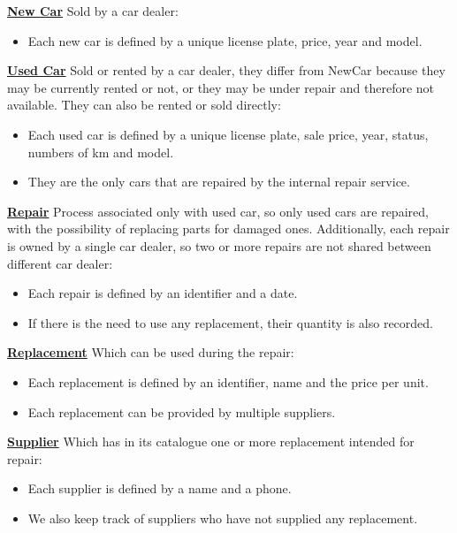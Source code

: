 \noindent \textbf{{\large \underline{New Car}}} 
\vspace{0.1cm}
\newline
Sold by a car dealer: 
\begin{itemize}
    \item Each new car is defined by a unique license plate, price, year and model. 
\end{itemize}

\noindent \textbf{{\large \underline{Used Car}}} 
\vspace{0.1cm}
\newline
Sold or rented by a car dealer, they differ from NewCar because they may be currently rented
or not, or they may be under repair and therefore not available. They can also be rented or sold directly: 
\begin{itemize} 
    \item Each used car is defined by a unique license plate, sale price, year, status, numbers of km and model.
    \item They are the only cars that are repaired by the internal repair service.
\end{itemize}

\noindent \textbf{{\large \underline{Repair}}} 
\vspace{0.1cm}
\newline
Process associated only with used car, so only used cars are repaired, with the possibility
of replacing parts for damaged ones. Additionally, each repair is owned by a single car dealer, so two or more repairs 
are not shared between different car dealer: 
\begin{itemize}
    \item Each repair is defined by an identifier and a date.
    \item If there is the need to use any replacement, their quantity is also recorded. 
\end{itemize}

\noindent \textbf{{\large \underline{Replacement}}} 
\vspace{0.1cm}
\newline
Which can be used during the repair: 
\begin{itemize}
    \item Each replacement is defined by an identifier, name and the price per unit.
    \item Each replacement can be provided by multiple suppliers.
\end{itemize}

\noindent \textbf{{\large \underline{Supplier}}} 
\vspace{0.1cm}
\newline
Which has in its catalogue one or more replacement intended for repair: 
\begin{itemize} 
    \item Each supplier is defined by a name and a phone. 
    \item We also keep track of suppliers who have not supplied any replacement. 
\end{itemize}